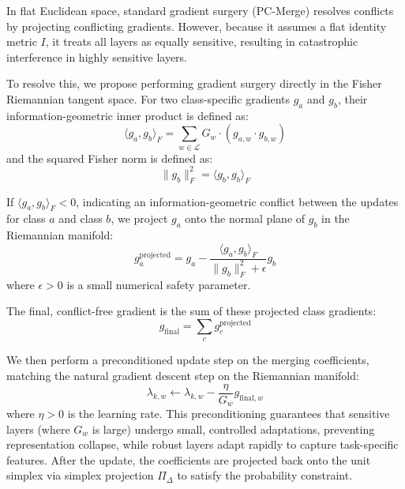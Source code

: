 \documentclass{article}
\theoremstyle{plain}
\theoremstyle{definition}
\theoremstyle{remark}
\begin{document}
In flat Euclidean space, standard gradient surgery (PC-Merge) resolves conflicts by projecting conflicting gradients. However, because it assumes a flat identity metric $I$, it treats all layers as equally sensitive, resulting in catastrophic interference in highly sensitive layers. 

To resolve this, we propose performing gradient surgery directly in the Fisher Riemannian tangent space. For two class-specific gradients $g_a$ and $g_b$, their information-geometric inner product is defined as:
\begin{equation}
    \langle g_a, g_b \rangle_F = \sum_{w \in \mathcal{L}} G_w \cdot (g_{a,w} \cdot g_{b,w})
\end{equation}
and the squared Fisher norm is defined as:
\begin{equation}
    \|g_b\|_F^2 = \langle g_b, g_b \rangle_F
\end{equation}

If $\langle g_a, g_b \rangle_F < 0$, indicating an information-geometric conflict between the updates for class $a$ and class $b$, we project $g_a$ onto the normal plane of $g_b$ in the Riemannian manifold:
\begin{equation}
    g_a^{\text{projected}} = g_a - \frac{\langle g_a, g_b \rangle_F}{\|g_b\|_F^2 + \epsilon} g_b
\end{equation}
where $\epsilon > 0$ is a small numerical safety parameter.

The final, conflict-free gradient is the sum of these projected class gradients:
\begin{equation}
    g_{\text{final}} = \sum_c g_c^{\text{projected}}
\end{equation}

We then perform a preconditioned update step on the merging coefficients, matching the natural gradient descent step on the Riemannian manifold:
\begin{equation}
    \lambda_{k,w} \leftarrow \lambda_{k,w} - \frac{\eta}{G_w} g_{\text{final}, w}
\end{equation}
where $\eta > 0$ is the learning rate. This preconditioning guarantees that sensitive layers (where $G_w$ is large) undergo small, controlled adaptations, preventing representation collapse, while robust layers adapt rapidly to capture task-specific features. After the update, the coefficients are projected back onto the unit simplex via simplex projection $\Pi_{\Delta}$ to satisfy the probability constraint.
\end{document}
